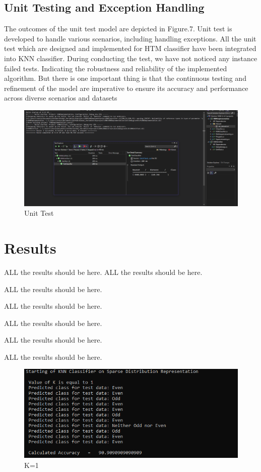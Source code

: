 \documentclass[conference]{IEEEtran}
\begin{document}
\subsection{Unit Testing and Exception Handling}
The outcomes of the unit test model are depicted in Figure.7. Unit test is developed to handle various scenarios, including handling exceptions. All the unit test which are designed and implemented for HTM classifier have been integrated into KNN classifier. During conducting the test, we have not noticed any instance failed tests. Indicating the robustness and reliability of the implemented algorithm. But there is one important thing is that the continuous testing and refinement of the model are imperative to ensure its accuracy and performance across diverse scenarios and datasets
\begin{figure}
    \centering
    \includegraphics[width=1.0\linewidth]{Unit Test Result.PNG}
    \caption{Unit Test}
    \label{fig:enter-label}
\end{figure}


\section{Results}
ALL the results should be here. 
ALL the results should be here. 

ALL the results should be here. 

ALL the results should be here. 




ALL the results should be here. 


ALL the results should be here. 

ALL the results should be here. 

\begin{figure}
    \centering
    \includegraphics[width=1.0\linewidth]{K=1.PNG}
    \caption{K=1}
    \label{fig:enter-label}
\end{figure}
\end{document}
